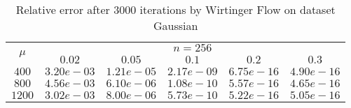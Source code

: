 \begin{table}\label{gaussian}
\centering
\begin{tabular}{|c|c|c|c|c|c|}

\hline
\multirow{2}{*}{ $\mu$} &\multicolumn{5}{c|}{$n = 256 $}\\\cline{2-6}
 &$0.02$ &$0.05$ &$0.1$ &$0.2$ &$0.3$\\\hline
$400$ & $3.20e-03$ & $1.21e-05$ & $2.17e-09$ & $6.75e-16$ & $4.90e-16$\\\hline
$800$ & $4.56e-03$ & $6.10e-06$ & $1.08e-10$ & $5.57e-16$ & $4.65e-16$\\\hline
$1200$ & $3.02e-03$ & $8.00e-06$ & $5.73e-10$ & $5.22e-16$ & $5.05e-16$\\\hline
\end{tabular}
\caption{Relative error after $3000$ iterations by Wirtinger Flow on dataset Gaussian}
\end{table}
